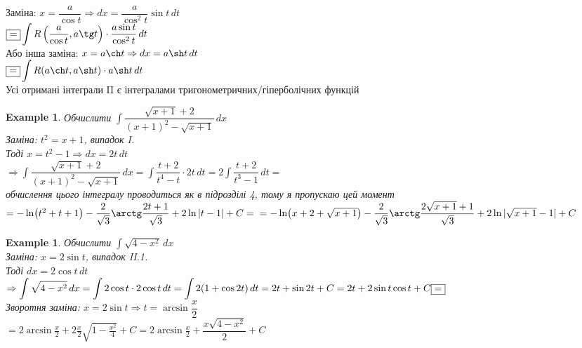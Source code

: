 \documentclass[a4paper, 14pt]{extarticle}
\def\huge{\displaystyle}
\def\bigline{\vspace{5mm}\\}
\theoremstyle{theoremdd}
\theoremstyle{theoremdd}
\theoremstyle{theoremdd}
\theoremstyle{theoremdd}
\newtheorem{example}[theorem]{Example}
\theoremstyle{theoremdd}
\theoremstyle{theoremdd}
\theoremstyle{theoremdd}
\theoremstyle{theoremdd}
\begin{document}
Заміна: $x = \dfrac{a}{\cos t} \Rightarrow dx = \dfrac{a}{\cos^2 t} \sin t\,dt$\\
$\boxed{=} \huge \int R \left(\dfrac{a}{\cos t}, a \tg t \right) \cdot \dfrac{a \sin t}{\cos ^2 t}\,dt$
\bigline
Або інша заміна: $x = a \ch t \Rightarrow dx = a \sh t \,dt$\\
$\boxed{=} \huge \int R(a \ch t, a \sh t) \cdot a \sh t \,dt$
\bigline
Усі отримані інтеграли II є інтегралами тригонометричних/гіперболічних функцій
\bigline
\begin{example} 
Обчислити $\huge \int \dfrac{\sqrt{x+1}+2}{(x+1)^2 - \sqrt{x+1}}\,dx$\\
Заміна: $t^2 = x+1$, випадок I.\\
Тоді $x = t^2 -1 \Rightarrow dx = 2t \,dt$\\
$\Rightarrow \huge \int \dfrac{\sqrt{x+1}+2}{(x+1)^2 - \sqrt{x+1}}\,dx = \int \dfrac{t+2}{t^4-t} \cdot 2t\,dt = 2 \int \dfrac{t+2}{t^3-1}\,dt =$\\
обчислення цього інтегралу проводиться як в підрозділі 4, тому я пропускаю цей момент\\
$= -\ln(t^2+t+1) - \dfrac{2}{\sqrt{3}} \arctg \dfrac{2t+1}{\sqrt{3}} + 2 \ln|t-1|+ C = \\
= -\ln(x+2+\sqrt{x+1}) - \dfrac{2}{\sqrt{3}} \arctg \dfrac{2\sqrt{x+1}+1}{\sqrt{3}} + 2 \ln|\sqrt{x+1}-1| + C$
\end{example}

\begin{example}
Обчислити $\huge \int \sqrt{4-x^2}\,dx$\\
Заміна: $x = 2\sin t$, випадок II.1.\\
Тоді $dx = 2 \cos t \,dt$\\
$\Rightarrow \huge \int \sqrt{4-x^2}\,dx = \int 2 \cos t \cdot 2 \cos t \,dt = \int 2(1+\cos 2t)\,dt = 2t + \sin 2t + C
\\ = 2t + 2 \sin t \cos t + C \boxed{=} $\\
Зворотня заміна: $x = 2 \sin t \Rightarrow t = \arcsin \dfrac{x}{2}$\\
$ \boxed{=} \huge 2 \arcsin \frac{x}{2} + 2 \frac{x}{2} \sqrt{1-\frac{x^2}{4}}+C = 2 \arcsin \frac{x}{2} + \dfrac{x \sqrt{4-x^2}}{2} + C$
\end{example}
\medskip
\end{document}
